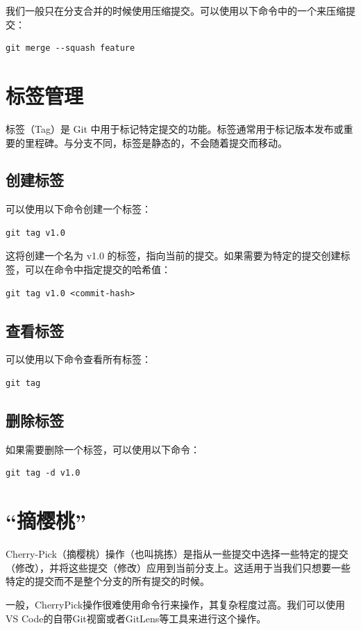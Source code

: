 我们一般只在分支合并的时候使用压缩提交。可以使用以下命令中的一个来压缩提交：
\begin{verbatim}
git merge --squash feature
\end{verbatim}

\section{标签管理}
标签（Tag）是 Git 中用于标记特定提交的功能。标签通常用于标记版本发布或重要的里程碑。与分支不同，标签是静态的，不会随着提交而移动。

\subsection{创建标签}
可以使用以下命令创建一个标签：
\begin{verbatim}
git tag v1.0
\end{verbatim}

这将创建一个名为 v1.0 的标签，指向当前的提交。如果需要为特定的提交创建标签，可以在命令中指定提交的哈希值：
\begin{verbatim}
git tag v1.0 <commit-hash>
\end{verbatim}

\subsection{查看标签}
可以使用以下命令查看所有标签：
\begin{verbatim}
git tag
\end{verbatim}

\subsection{删除标签}
如果需要删除一个标签，可以使用以下命令：
\begin{verbatim}
git tag -d v1.0
\end{verbatim}

\section{“摘樱桃”}

Cherry-Pick（摘樱桃）操作（也叫挑拣）是指从一些提交中选择一些特定的提交（修改），并将这些提交（修改）应用到当前分支上。这适用于当我们只想要一些特定的提交而不是整个分支的所有提交的时候。

一般，CherryPick操作很难使用命令行来操作，其复杂程度过高。我们可以使用VS Code的自带Git视窗或者GitLens等工具来进行这个操作。

